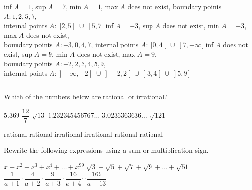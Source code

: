\begin{Answer}\phantom{}

    \Question inf $A=1$, sup $A=7$, min $A=1$, max $A$ does not exist, boundary points $A: 1, 2, 5, 7$, \\ internal points $A:\; ]2,5[ \;\cup\; ]5,7[$
    \Question inf $A=-3$, sup $A$ does not exist, min $A=-3$, max $A$ does not exist, \\ boundary points $A: -3, 0, 4, 7$, internal points $A: \; ]0,4[ \; \cup \; ]7,+\infty[$
    \Question inf $A$ does not exist, sup $A=9$, min $A$ does not exist, max $A=9$, \\ boundary points $A: -2, 2, 3, 4, 5, 9$, \\ internal points $A:\; ]-\infty,-2[\; \cup\; ]-2,2[\;\cup\; ]3,4[ \;\cup\; ]5,9[$
\end{Answer}
		
\fi

\subsection*{}

\begin{Exercise}[difficulty = 1] Which of the numbers below are rational or irrational?
	\begin{multicols}{2}
			\Question $5.369$
			\Question $\dfrac{12}{7}$
			\Question $\sqrt{13}$
			\Question $1.232345456767\ldots$
			\Question $3.0236363636\ldots$
			\Question $\sqrt{121}$
		    \EndCurrentQuestion
	\end{multicols}
\end{Exercise}

\begin{Answer}\phantom{}
    \begin{multicols}{3}
		
			\Question rational
			\Question rational
			\Question irrational
			\Question irrational
			\Question rational
			\Question rational
		\EndCurrentQuestion 
	\end{multicols}
\end{Answer}
	
\begin{Exercise} Rewrite the following expressions using a sum or multiplication sign.
    \begin{multicols}{2}
    	\Question[difficulty = 1] $x + x^2 + x^3 + x^4 + \ldots + x^{99}$ 
    	\Question[difficulty = 1] $\sqrt{3} + \sqrt{5} + \sqrt{7} + \sqrt{9} + \ldots + \sqrt{51} $ 
    	\Question[difficulty = 1] $ \dfrac{1}{a+1} \cdot \dfrac{4}{a+2} \cdot \dfrac{9}{a+3} \cdot \dfrac{16}{a+4}  \cdots  \dfrac{169}{a+13}$
    	\EndCurrentQuestion
    \end{multicols}
\end{Exercise}

